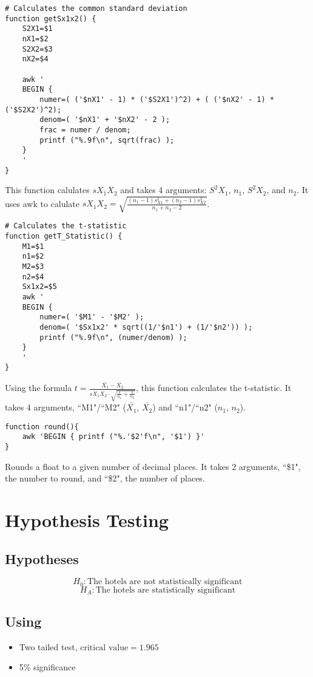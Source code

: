 \documentclass[a4paper]{article}
\begin{document}
\begin{lstlisting}
# Calculates the common standard deviation
function getSx1x2() {
	S2X1=$1
	nX1=$2
	S2X2=$3
	nX2=$4

	awk '
	BEGIN {
		numer=( ('$nX1' - 1) * ('$S2X1')^2) + ( ('$nX2' - 1) * ('$S2X2')^2);
		denom=( '$nX1' + '$nX2' - 2 );
		frac = numer / denom;
		printf ("%.9f\n", sqrt(frac) );
	}
	'
}
\end{lstlisting}
This function calulates $s X_1 X_2$ and takes 4 arguments: $S^2X_1$, $n_1$, $S^2X_2$, and  $n_2$.
It uses awk to calulate $s X_1 X_2 = \sqrt{\frac{(n_1 - 1)s^{2}_{X1} + (n_2 - 1)s^{2}_{X2}}{n_1 + n_2 - 2}}$.

\begin{lstlisting}
# Calculates the t-statistic
function getT_Statistic() {
	M1=$1
	n1=$2
	M2=$3
	n2=$4
	Sx1x2=$5
	awk '
	BEGIN {
		numer=( '$M1' - '$M2' );
		denom=( '$Sx1x2' * sqrt((1/'$n1') + (1/'$n2')) );
		printf ("%.9f\n", (numer/denom) );
	}
	'
}
\end{lstlisting}
Using the formula $t = \frac{\bar{X_1} - \bar{X_2}}{s X_1 X_2 \cdot \sqrt{\frac{1}{n_1} + \frac{1}{n_2}}}$, this function calculates the t-statistic.
It takes 4 arguments, ``M1"/``M2" ($\bar{X_1}$, $\bar{X_2}$) and ``n1"/``n2" ($n_1$, $n_2$).

\begin{lstlisting}
function round(){
	awk 'BEGIN { printf ("%.'$2'f\n", '$1') }'
}
\end{lstlisting}
Rounds a float to a given number of decimal places.
It takes 2 arguments, ``\$1", the number to round, and ``\$2", the number of places.

\newpage
\section{Hypothesis Testing}
\subsection{Hypotheses}
\begin{equation}
H_{0} : \textrm{The hotels are not statistically significant}
\end{equation}
\begin{equation}
H_{A} : \textrm{The hotels are statistically significant}
\end{equation}

\subsection{Using}
\begin{itemize}
	\item Two tailed test, $\textrm{critical value} = 1.965$
	\item 5\% significance
\end{itemize}
\end{document}
